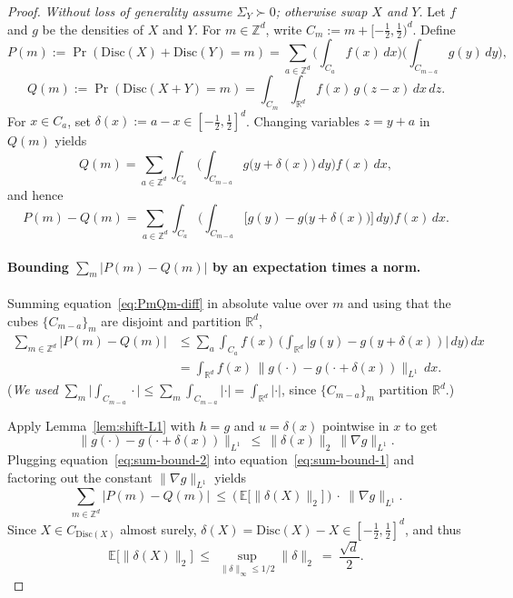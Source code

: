 \documentclass[10pt]{article} %
\def\eqref#1{equation~\ref{#1}}
\theoremstyle{plain}
\newcommand{\disc}{\mathrm{Disc}}
\begin{document}
\begin{proof}
\emph{Without loss of generality assume $\Sigma_Y\succ 0$; otherwise swap $X$ and $Y$.}
Let $f$ and $g$ be the densities of $X$ and $Y$. For $m\in\mathbb{Z}^d$, write $C_m:=m+[-\tfrac12,\tfrac12)^d$.
Define
\[
P(m):=\Pr(\disc(X)+\disc(Y)=m)
=\sum_{a\in\mathbb{Z}^d}\Big(\int_{C_a} f(x)\,dx\Big)\Big(\int_{C_{m-a}} g(y)\,dy\Big),
\]
\[
Q(m):=\Pr(\disc(X+Y)=m)
=\int_{C_m}\int_{\mathbb{R}^d} f(x)\,g(z-x)\,dx\,dz.
\]
For $x\in C_a$, set $\delta(x):=a-x\in[-\tfrac12,\tfrac12]^d$. Changing variables $z=y+a$ in $Q(m)$ yields
\[
Q(m)=\sum_{a\in\mathbb{Z}^d}\int_{C_a}\!\Big(\int_{C_{m-a}} g\big(y+\delta(x)\big)\,dy\Big) f(x)\,dx,
\]
and hence
\begin{equation}\label{eq:PmQm-diff}
P(m)-Q(m)
=\sum_{a\in\mathbb{Z}^d}\int_{C_a}\!\Big(\int_{C_{m-a}}\!\big[g(y)-g\big(y+\delta(x)\big)\big]\,dy\Big) f(x)\,dx.
\end{equation}

\paragraph{Bounding $\sum_m |P(m)-Q(m)|$ by an expectation times a norm.}
Summing \eqref{eq:PmQm-diff} in absolute value over $m$ and using that the cubes $\{C_{m-a}\}_m$ are disjoint and partition $\mathbb{R}^d$,
\begin{align}
\sum_{m\in\mathbb{Z}^d}\!|P(m)-Q(m)|
&\le \sum_{a}\int_{C_a} f(x)\,\Big(\int_{\mathbb{R}^d}\!\big|g(y)-g(y+\delta(x))\big|\,dy\Big)\,dx \nonumber\\
&= \int_{\mathbb{R}^d} f(x)\,\big\|g(\cdot)-g(\cdot+\delta(x))\big\|_{L^1}\,dx.
\label{eq:sum-bound-1}
\end{align}
(\emph{We used }$\sum_m\big|\int_{C_{m-a}}\!\cdot\big|
\le \sum_m\int_{C_{m-a}}\!|\cdot|
= \int_{\mathbb{R}^d}\!|\cdot|$,
since $\{C_{m-a}\}_m$ partition $\mathbb{R}^d$.)

Apply Lemma~\ref{lem:shift-L1} with $h=g$ and $u=\delta(x)$ pointwise in $x$ to get
\begin{equation}\label{eq:sum-bound-2}
\big\|g(\cdot)-g(\cdot+\delta(x))\big\|_{L^1}\ \le\ \|\delta(x)\|_2\ \|\nabla g\|_{L^1}.
\end{equation}
Plugging \eqref{eq:sum-bound-2} into \eqref{eq:sum-bound-1} and factoring out the constant $\|\nabla g\|_{L^1}$ yields
\begin{equation}\label{eq:product-form}
\sum_{m\in\mathbb{Z}^d}\!|P(m)-Q(m)|
\ \le\ \Big(\,\mathbb{E}\big[\|\delta(X)\|_2\big]\,\Big)\ \cdot\ \|\nabla g\|_{L^1}.
\end{equation}
Since $X\in C_{\disc(X)}$ almost surely, $\delta(X)=\disc(X)-X\in[-\tfrac12,\tfrac12]^d$, and thus
\begin{equation}\label{eq:delta-expect}
\mathbb{E}\big[\|\delta(X)\|_2\big]\ \le\ \sup_{\|\delta\|_\infty\le 1/2}\|\delta\|_2\ =\ \frac{\sqrt{d}}{2}.
\end{equation}


\end{proof}
\end{document}
